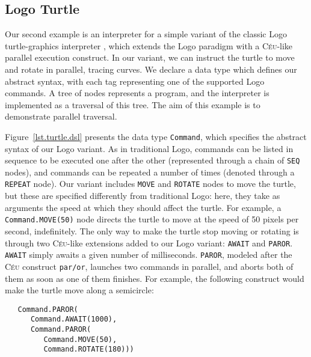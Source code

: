 \documentclass{acm_proc_article-sp}
\newcommand{\CEU}{\textsc{C\'{e}u}\xspace}
\newcommand{\code}[1] {{\small{\texttt{#1}}}}
\begin{document}
\subsection{Logo Turtle}

Our second example is an interpreter for a simple variant of the classic Logo
turtle-graphics interpreter \cite{papert.logo}, which extends the Logo
paradigm with a \CEU-like parallel execution construct. In our variant, we can
instruct the turtle to move and rotate in parallel, tracing curves. We declare
a data type which defines our abstract syntax, with each tag representing one
of the supported Logo commands. A tree of nodes represents a program, and the
interpreter is implemented as a traversal of this tree. The aim of this
example is to demonstrate parallel traversal.

Figure~\ref{lst.turtle.dsl} presents the data type \code{Command}, which
specifies the abstract syntax of our Logo variant. As in traditional Logo,
commands can be listed in sequence to be executed one after the other
(represented through a chain of \code{SEQ} nodes), and commands can be
repeated a number of times (denoted through a \code{REPEAT} node). Our variant
includes \code{MOVE} and \code{ROTATE} nodes to move the turtle, but these are
specified differently from traditional Logo: here, they take as arguments the
speed at which they should affect the turtle. For example, a
\code{Command.MOVE(50)} node directs the turtle to move at the speed of 50
pixels per second, indefinitely. The only way to make the turtle stop moving
or rotating is through two \CEU-like extensions added to our Logo variant:
\code{AWAIT} and \code{PAROR}. \code{AWAIT} simply awaits a given number of
milliseconds. \code{PAROR}, modeled after the \CEU construct \code{par/or},
launches two commands in parallel, and aborts both of them as soon as one of
them finishes. For example, the following construct would make the turtle move
along a semicircle:

\begin{verbatim}
   Command.PAROR(
      Command.AWAIT(1000),
      Command.PAROR(
         Command.MOVE(50),
         Command.ROTATE(180)))
\end{verbatim}
\end{document}

